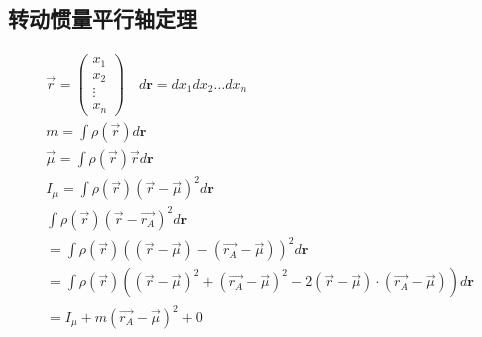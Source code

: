 \subsection{转动惯量平行轴定理}


\begin{gather}
    \overrightarrow{r}=
    \begin{pmatrix}
        x_{1}\\
        x_{2}\\
        \vdots\\
        x_{n}
    \end{pmatrix}
    \quad
    d\bm{r} = dx_{1}dx_{2}...dx_{n}\\
    m=\int \rho(\overrightarrow{r})d\bm{r}\\
    \overrightarrow{\mu}=\int \rho(\overrightarrow{r})\overrightarrow{r}d\bm{r}\\
    I_{\mu} = \int \rho(\overrightarrow{r})(\overrightarrow{r}-\overrightarrow{\mu})^{2}d\bm{r}\\
    \int \rho(\overrightarrow{r})(\overrightarrow{r}-\overrightarrow{r_{A}})^{2}d\bm{r}\\
    =\int \rho(\overrightarrow{r})((\overrightarrow{r}-\overrightarrow{\mu})-(\overrightarrow{r_{A}}-\overrightarrow{\mu}))^{2}d\bm{r}\\
    =\int \rho(\overrightarrow{r})((\overrightarrow{r}-\overrightarrow{\mu})^{2}
    +(\overrightarrow{r_{A}}-\overrightarrow{\mu})^{2}
    -2(\overrightarrow{r}-\overrightarrow{\mu})\cdot(\overrightarrow{r_{A}}-\overrightarrow{\mu}))d\bm{r}\\
    =I_{\mu}+m(\overrightarrow{r_{A}}-\overrightarrow{\mu})^{2}+0
\end{gather}


